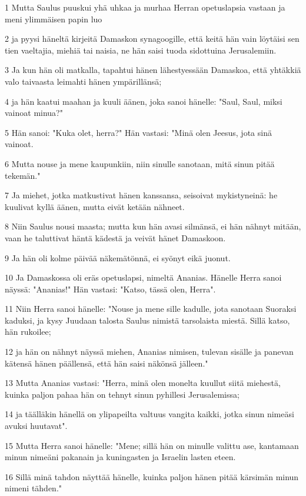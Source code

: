 \par 1 Mutta Saulus puuskui yhä uhkaa ja murhaa Herran opetuslapsia vastaan ja meni ylimmäisen papin luo
\par 2 ja pyysi häneltä kirjeitä Damaskon synagoogille, että keitä hän vain löytäisi sen tien vaeltajia, miehiä tai naisia, ne hän saisi tuoda sidottuina Jerusalemiin.
\par 3 Ja kun hän oli matkalla, tapahtui hänen lähestyessään Damaskoa, että yhtäkkiä valo taivaasta leimahti hänen ympärillänsä;
\par 4 ja hän kaatui maahan ja kuuli äänen, joka sanoi hänelle: "Saul, Saul, miksi vainoat minua?"
\par 5 Hän sanoi: "Kuka olet, herra?" Hän vastasi: "Minä olen Jeesus, jota sinä vainoat.
\par 6 Mutta nouse ja mene kaupunkiin, niin sinulle sanotaan, mitä sinun pitää tekemän."
\par 7 Ja miehet, jotka matkustivat hänen kanssansa, seisoivat mykistyneinä: he kuulivat kyllä äänen, mutta eivät ketään nähneet.
\par 8 Niin Saulus nousi maasta; mutta kun hän avasi silmänsä, ei hän nähnyt mitään, vaan he taluttivat häntä kädestä ja veivät hänet Damaskoon.
\par 9 Ja hän oli kolme päivää näkemätönnä, ei syönyt eikä juonut.
\par 10 Ja Damaskossa oli eräs opetuslapsi, nimeltä Ananias. Hänelle Herra sanoi näyssä: "Ananias!" Hän vastasi: "Katso, tässä olen, Herra".
\par 11 Niin Herra sanoi hänelle: "Nouse ja mene sille kadulle, jota sanotaan Suoraksi kaduksi, ja kysy Juudaan talosta Saulus nimistä tarsolaista miestä. Sillä katso, hän rukoilee;
\par 12 ja hän on nähnyt näyssä miehen, Ananias nimisen, tulevan sisälle ja panevan kätensä hänen päällensä, että hän saisi näkönsä jälleen."
\par 13 Mutta Ananias vastasi: "Herra, minä olen monelta kuullut siitä miehestä, kuinka paljon pahaa hän on tehnyt sinun pyhillesi Jerusalemissa;
\par 14 ja täälläkin hänellä on ylipapeilta valtuus vangita kaikki, jotka sinun nimeäsi avuksi huutavat".
\par 15 Mutta Herra sanoi hänelle: "Mene; sillä hän on minulle valittu ase, kantamaan minun nimeäni pakanain ja kuningasten ja Israelin lasten eteen.
\par 16 Sillä minä tahdon näyttää hänelle, kuinka paljon hänen pitää kärsimän minun nimeni tähden."
